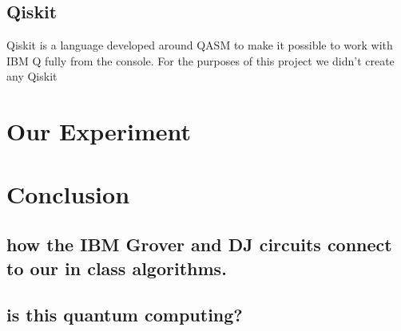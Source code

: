 \documentclass{article}
\begin{document}
    \subsection{Qiskit}
        Qiskit is a language developed around QASM to make it possible to work with IBM Q fully from the console. For the purposes of this project we didn't create any Qiskit 
\section{Our Experiment}
\section{Conclusion}
\subsection{how the IBM Grover and DJ circuits connect to our in class algorithms.}
\subsection{is this quantum computing?}
\end{document}
